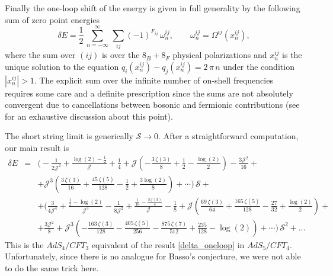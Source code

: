 Finally the one-loop shift of the energy is given in full generality by the following sum of zero point energies
\begin{equation}
\label{eq:one-loop-correction}
\delta E = \frac{1}{2}\,\sum_{n=-\infty}^{\infty}\,\sum_{ij}(-1)^{F_{ij}}\,\omega^{ij}_{n},\qquad
\omega_{n}^{ij} = \Omega^{ij}(x^{ij}_{n}),
\end{equation}
where the sum over $(ij)$ is over the $8_{B}+8_{F}$ physical polarizations and $x^{ij}_{n}$ is the unique solution to the equation $q_{i}(x^{ij}_{n})-q_{j}(x^{ij}_{n}) = 2\,\pi\,n$ under the condition $|x_{n}^{ij}|>1$. The explicit sum over the infinite number of on-shell frequencies requires some care and a definite prescription  since the sums are not absolutely convergent due to cancellations between bosonic and fermionic contributions (see \cite{Beccaria:2012qd} for an exhaustive discussion about this point).

The short string limit is generically $\mathcal S\to 0$. After a straightforward computation, our main result is 
\begin{eqnarray}
\label{eq:GV}
\delta E &=& 
\bigg(
-\frac{1}{2 \mathcal{J}^2}+\frac{\log (2)-\frac{1}{2}}{\mathcal{J}}+\frac{1}{4}+\mathcal{J} \left(-\frac{3 \,\zeta (3)}{8}+\frac{1}{2}-\frac{\log (2)}{2}\right)-\frac{3
   \mathcal{J}^2}{16}+\\
   &&+\mathcal{J}^3 \left(\frac{3 \,\zeta (3)}{16}+\frac{45 \,\zeta (5)}{128}-\frac{1}{2}+\frac{3 \log (2)}{8}\right)+
   \cdots
\bigg)\,\mathcal S+ \nonumber \\
&& +\bigg(
\frac{3}{4 \mathcal{J}^4}+\frac{\frac{1}{2}-\log (2)}{\mathcal{J}^3}-\frac{1}{8 \mathcal{J}^2}+\frac{\frac{1}{16}-\frac{3 \,\zeta (3)}{4}}{\mathcal{J}}-\frac{1}{8}+\mathcal{J} \left(\frac{69 \,\zeta
   (3)}{64}+\frac{165 \,\zeta (5)}{128}-\frac{27}{32}+\frac{\log (2)}{2}\right)+\nonumber \\
   && +\frac{3 \mathcal{J}^2}{8}+\mathcal{J}^3 \left(-\frac{163 \,\zeta (3)}{128}-\frac{405 \,\zeta (5)}{256}-\frac{875 \,\zeta
   (7)}{512}+\frac{235}{128}-\log (2)\right)+\cdots
\bigg)\,\mathcal S^{2}+ \dots
\end{eqnarray}
This is the $AdS_4/CFT_3$ equivalent of the result \ref{delta_oneloop} in $AdS_5/CFT_4$. Unfortunately, since there is no analogue for Basso's conjecture, we were not able to do the same trick here.


